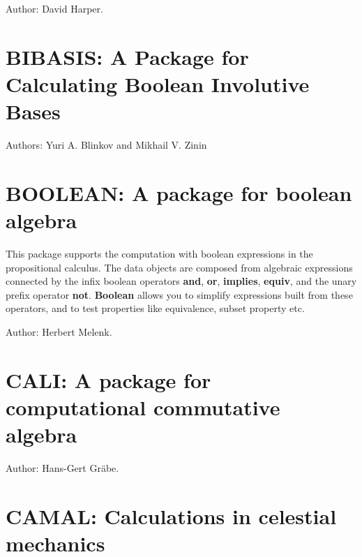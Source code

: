 Author: David Harper.


\newpage

\section{BIBASIS: A Package for Calculating Boolean Involutive Bases}
 \label{BIBASIS}

Authors: Yuri A. Blinkov and Mikhail V. Zinin


\newpage

\section{BOOLEAN: A package for boolean algebra} 

This package supports the computation with boolean expressions in the
propositional calculus.  The data objects are composed from algebraic
expressions connected by the infix boolean operators {\bf and}, {\bf or},
{\bf implies}, {\bf equiv}, and the unary prefix operator {\bf not}.
{\bf Boolean} allows you to simplify expressions built from these
operators, and to test properties like equivalence, subset property etc.

Author: Herbert Melenk.


\newpage

\section{CALI: A package for computational commutative algebra}

\iffalse
This package contains algorithms for computations in commutative algebra
closely related to the Gr\"obner algorithm for ideals and modules.  Its
heart is a new implementation of the Gr\"obner algorithm that also allows
for the computation of syzygies.  This implementation is also applicable to
submodules of free modules with generators represented as rows of a matrix.
\fi
Author: Hans-Gert Gr\"abe.


\newpage

\section{CAMAL: Calculations in celestial mechanics}
\label{CAMAL}

